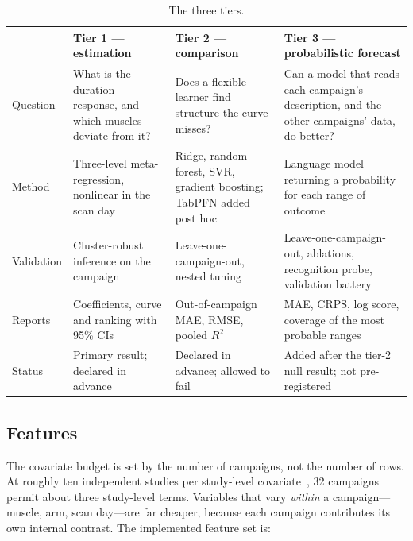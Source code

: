 \begin{table}[htbp]
\centering
\caption{The three tiers.}
\label{tab:tiers}
\small
\begin{tabularx}{\linewidth}{@{}l Y Y Y@{}}
\toprule
& Tier 1 --- estimation & Tier 2 --- comparison & Tier 3 --- probabilistic forecast \\
\midrule
Question & What is the duration--response, and which muscles deviate from it? & Does a flexible learner find
  structure the curve misses? & Can a model that reads each campaign's description, and the other campaigns' data,
  do better? \\
Method & Three-level meta-regression, nonlinear in the scan day & Ridge, random forest, SVR, gradient boosting;
  TabPFN added post hoc &
  Language model returning a probability for each range of outcome \\
Validation & Cluster-robust inference on the campaign & Leave-one-campaign-out, nested tuning & Leave-one-campaign-out,
  ablations, recognition probe, validation battery \\
Reports & Coefficients, curve and ranking with 95\% CIs & Out-of-campaign MAE, RMSE, pooled $R^2$ & MAE, CRPS, log
  score, coverage of the most probable ranges \\
Status & Primary result; declared in advance & Declared in advance; allowed to fail & Added after the tier-2 null
  result; not pre-registered \\
\bottomrule
\end{tabularx}
\end{table}

\subsection{Features}
\label{sec:features}

The covariate budget is set by the number of campaigns, not the number of rows. At roughly ten independent studies
per study-level covariate~\citep{higgins2011}, 32 campaigns permit about three study-level terms. Variables that
vary \emph{within} a campaign---muscle, arm, scan day---are far cheaper, because each campaign contributes its own
internal contrast. The implemented feature set is:

